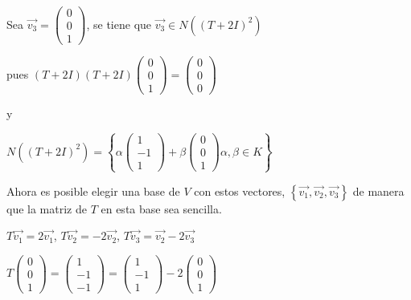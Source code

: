 \begin{example}
\bigskip

Sea $\vec{v_3}=\left(\begin{array}{c} 0 \\ 0
\\  1 \end{array}\right)$, se tiene que $ \vec{v_3} \in N((T+2 I )^2)$
 
pues 
$(T+2I)(T+2I)\left(\begin{array}{c} 0 \\ 0 
\\  1 \end{array}\right)=\left(\begin{array}{c} 0\\ 0
\\  0 \end{array}\right) $ 

y 

\bigskip

$N((T+2 I )^2)=\left\{\alpha   \left(\begin{array}{c} 1 \\ -1 
\\  1 \end{array}\right) + \beta  \left(\begin{array}{c} 0 \\ 0 
\\  1
\end{array} \right)    \alpha, \beta \in K    \right\}$

\bigskip

Ahora es posible  elegir una base de $V$ con estos vectores, $\left\{\vec{v_1},\vec{v_2},\vec{v_3}\right\}$  de manera que la matriz de $T$ en esta base sea sencilla.






\bigskip



$T \vec{v_1}=2\vec{v_1}$, $T \vec{v_2}=-2\vec{v_2}$, $T \vec{v_3}=\vec{v_2}-2\vec{v_3}$


\bigskip

$T \left(\begin{array}{c} 0 \\ 0 
\\  1 \end{array}\right)=\left(\begin{array}{c} 1 \\ -1
\\  -1 \end{array}\right) =\left(\begin{array}{c} 1 \\ -1
\\  1 \end{array}\right)-2 \left(\begin{array}{c} 0 \\ 0
\\  1 \end{array}\right)$


\end{example}
